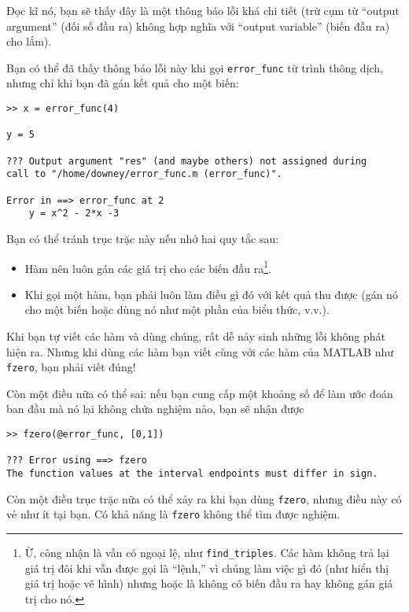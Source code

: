 \documentclass[12pt]{book}
\begin{document}
Đọc kĩ nó, bạn sẽ thấy đây là một thông báo lỗi khá chi tiết
(trừ cụm từ ``output argument'' (đối số đầu ra) không hợp nghĩa với
``output variable'' (biến đầu ra) cho lắm).

Bạn có thể đã thấy thông báo lỗi này khi gọi \verb#error_func# từ
trình thông dịch, nhưng chỉ khi bạn đã gán kết quả cho một biến:

\begin{verbatim}
>> x = error_func(4)

y = 5

??? Output argument "res" (and maybe others) not assigned during 
call to "/home/downey/error_func.m (error_func)".

Error in ==> error_func at 2
    y = x^2 - 2*x -3
\end{verbatim}

Bạn có thể tránh trục trặc này nếu nhớ hai quy tắc sau:

\begin{itemize}

\item Hàm nên luôn gán các giá trị cho các biến đầu ra\footnote{Ừ,
công nhận là vẫn có ngoại lệ, như {\tt find\_triples}.  Các hàm không
trả lại giá trị đôi khi vẫn được gọi là ``lệnh,'' vì chúng làm việc gì đó 
(như hiển thị giá trị hoặc vẽ hình) nhưng hoặc là không có biến đầu ra
hay không gán giá trị cho nó.}.

\item Khi gọi một hàm, bạn phải luôn làm điều gì đó với kết quả thu được
(gán nó cho một biến hoặc dùng nó như một phần của biểu thức, v.v.).

\end{itemize}

Khi bạn tự viết các hàm và dùng chúng, rất dễ nảy sinh những lỗi không
phát hiện ra. Nhưng khi dùng các hàm bạn viết cùng với các hàm của
MATLAB như {\tt fzero}, bạn phải viết đúng!

Còn một điều nữa có thể sai: nếu bạn cung cấp một khoảng số để làm 
ước đoán ban đầu mà nó lại không chứa nghiệm nào, bạn sẽ nhận được

\begin{verbatim}
>> fzero(@error_func, [0,1])

??? Error using ==> fzero
The function values at the interval endpoints must differ in sign.
\end{verbatim}

Còn một điều trục trặc nữa có thể xảy ra khi bạn dùng {\tt fzero}, nhưng
điều này có vẻ như ít tại bạn. Có khả năng là {\tt fzero} không thể tìm
được nghiệm.
\end{document}
